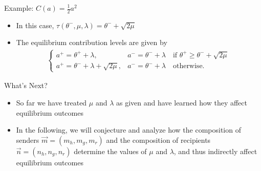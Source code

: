 \documentclass[9pt]{beamer}
\begin{document}
\begin{frame}{Example: $C(a) = \frac{1}{2}a^2$}

\begin{itemize}\setlength{\itemsep}{1em}
    \item In this case, $\tau(\theta^-,\mu,\lambda) = \theta^- + \sqrt{2\mu}$
    \item The equilibrium contribution levels are given by
    \begin{align*}
    \begin{cases}
        a^+ = \theta^++\lambda,  &a^- = \theta^-+\lambda  \quad\text{if } \theta^+\geq \theta^-+\sqrt{2\mu} \\
        a^+ = \theta^-+\lambda+\sqrt{2\mu}, &a^- =  \theta^-+\lambda  \quad \text{otherwise.}
    \end{cases}
    \end{align*}
\end{itemize}
\end{frame}

\begin{frame}{What's Next?}
\begin{itemize}\setlength{\itemsep}{1em}
    \item So far we have treated $\mu$ and $\lambda$ as given and have learned how they affect equilibrium outcomes
    \item In the following, we will conjecture and analyze how the composition of senders $\vec{m} = (m_h,m_g,m_r)$ and the composition of recipients $\vec{n} = (n_h,n_g,n_r)$ determine the values of $\mu$ and $\lambda$, and thus indirectly affect equilibrium outcomes
\end{itemize}
\end{frame}
\end{document}
